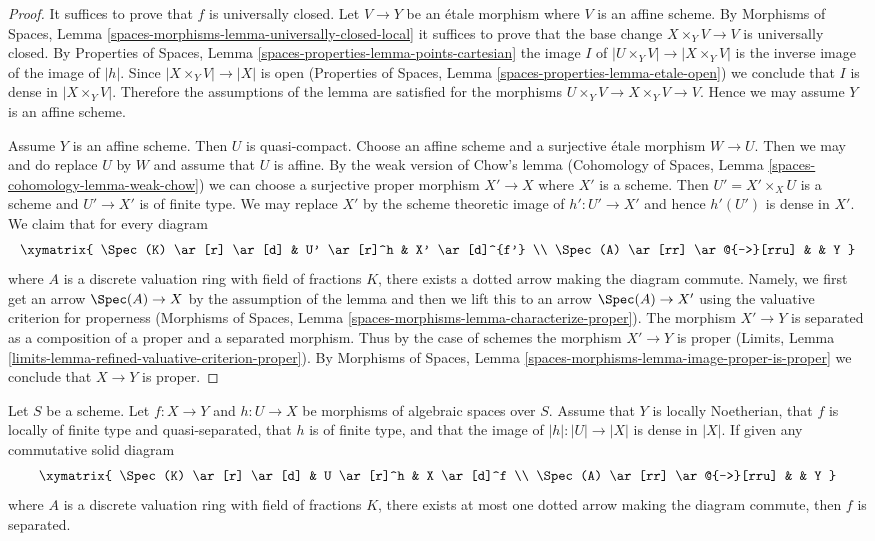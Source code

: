 \begin{proof}
It suffices to prove that $f$ is universally closed.
Let $V \to Y$ be an \'etale morphism where $V$ is an affine scheme.
By Morphisms of Spaces, Lemma
\ref{spaces-morphisms-lemma-universally-closed-local}
it suffices to prove that the base change $X \times_Y V \to V$ is
universally closed. By Properties of Spaces, Lemma
\ref{spaces-properties-lemma-points-cartesian}
the image $I$ of $|U \times_Y V| \to |X \times_Y V|$
is the inverse image of the image of $|h|$. Since
$|X \times_Y V| \to |X|$ is open
(Properties of Spaces, Lemma \ref{spaces-properties-lemma-etale-open})
we conclude that $I$ is dense in $|X \times_Y V|$.
Therefore the assumptions of the lemma are
satisfied for the morphisms $U \times_Y V \to X \times_Y V \to V$.
Hence we may assume $Y$ is an affine scheme.

\medskip\noindent
Assume $Y$ is an affine scheme. Then $U$ is quasi-compact. Choose
an affine scheme and a surjective \'etale morphism $W \to U$.
Then we may and do replace $U$ by $W$ and assume that $U$ is affine.
By the weak version of Chow's lemma
(Cohomology of Spaces, Lemma \ref{spaces-cohomology-lemma-weak-chow})
we can choose a surjective proper morphism $X' \to X$
where $X'$ is a scheme. Then $U' = X' \times_X U$ is a scheme
and $U' \to X'$ is of finite type. We may replace $X'$ by
the scheme theoretic image of $h' : U' \to X'$ and hence $h'(U')$
is dense in $X'$. We claim that for every diagram
$$
\xymatrix{
\Spec(K) \ar[r] \ar[d] & U' \ar[r]^h & X' \ar[d]^{f'} \\
\Spec(A) \ar[rr] \ar@{-->}[rru] & & Y
}
$$
where $A$ is a discrete valuation ring with field of fractions $K$, there
exists a dotted arrow making the diagram commute. Namely, we first get an
arrow $\Spec(A) \to X$ by the assumption of the lemma and then we lift this
to an arrow $\Spec(A) \to X'$ using the valuative criterion for properness
(Morphisms of Spaces, Lemma \ref{spaces-morphisms-lemma-characterize-proper}).
The morphism $X' \to Y$ is separated
as a composition of a proper and a separated morphism.
Thus by the case of schemes the morphism $X' \to Y$ is proper
(Limits, Lemma
\ref{limits-lemma-refined-valuative-criterion-proper}).
By Morphisms of Spaces, Lemma
\ref{spaces-morphisms-lemma-image-proper-is-proper}
we conclude that $X \to Y$ is proper.
\end{proof}

\begin{lemma}
\label{lemma-refined-valuative-criterion-separated}
Let $S$ be a scheme. Let $f : X \to Y$ and $h : U \to X$ be
morphisms of algebraic spaces over $S$. Assume that $Y$ is
locally Noetherian, that $f$ is locally of finite type and quasi-separated,
that $h$ is of finite type, and that the image of $|h| : |U| \to |X|$
is dense in $|X|$.
If given any commutative solid diagram
$$
\xymatrix{
\Spec(K) \ar[r] \ar[d] & U \ar[r]^h & X \ar[d]^f \\
\Spec(A) \ar[rr] \ar@{-->}[rru] & & Y
}
$$
where $A$ is a discrete valuation ring with field of fractions $K$, there
exists at most one dotted arrow making the diagram commute, then $f$ is
separated.
\end{lemma}

